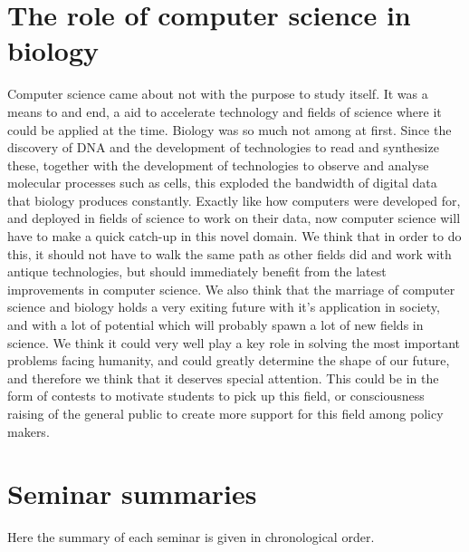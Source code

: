 \documentclass[a4paper]{article}
\begin{document}
\section{The role of computer science in biology}
Computer science came about not with the purpose to study itself. It was a means to and end, a aid to accelerate technology and fields of science where it could be applied at the time. Biology was so much not among at first. Since the discovery of DNA and the development of technologies to read and synthesize these, together with the development of technologies to observe and analyse molecular processes such as cells, this exploded the bandwidth of digital data that biology produces constantly. Exactly like how computers were developed for, and deployed in fields of science to work on their data, now computer science will have to make a quick catch-up in this novel domain. We think that in order to do this, it should not have to walk the same path as other fields did and work with antique technologies, but should immediately benefit from the latest improvements in computer science. We also think that the marriage of computer science and biology holds a very exiting future with it's application in society, and with a lot of potential which will probably spawn a lot of new fields in science. We think it could very well play a key role in solving the most important problems facing humanity, and could greatly determine the shape of our future, and therefore we think that it deserves special attention. This could be in the form of contests to motivate students to pick up this field, or consciousness raising of the general public to create more support for this field among policy makers.
\appendix

\section{Seminar summaries}
\label{abstracts}
Here the summary of each seminar is given in chronological order.





\end{document}
